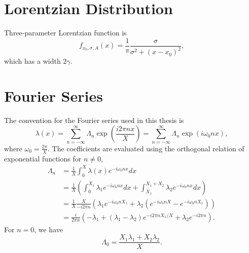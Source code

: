 \section{Lorentzian Distribution}


Three-parameter Lorentzian function is
\begin{equation}
  f_{x_0,\sigma,A}(x)= \frac{1}{\pi} \frac{\sigma}{\sigma^2 + (x-x_0)^2},
\end{equation}
which has a width $2\gamma$.


\section{Fourier Series}

The convention for the Fourier series used in this thesis is
\begin{equation}
\lambda(x) = \sum_{n=-\infty}^{\infty} \Lambda_n \exp\left( \frac{i2\pi n x}{X} \right) = \sum_{n=-\infty}^{\infty} \Lambda_n \exp\left( i \omega_0 n x \right),
\end{equation}
where $\omega_0 = \frac{2\pi}{X}$. The coefficients are evaluated using the orthogonal relation of exponential functions for $n\neq 0$,
\begin{align}
   \Lambda_n &= \frac{1}{X} \int_0^X \lambda(x) e^{ - i \omega_0 n x} dx \\
   & = \frac{1}{X} \left( \int_{0}^{X_1} \lambda_1 e^{ - i \omega_0 n x} dx + \int_{X_1}^{X_1+X_2} \lambda_2 e^{ - i \omega_0 n x} dx  \right) \\
   & = \frac{1}{X} \frac{X}{-i2\pi n} \left( \lambda_1 e^{-i\omega_0 n X_1} + \lambda_2 \left( e^{-i\omega_0 n X} - e^{-i\omega_0 n X_1}  \right) \right) \\
   & = \frac{i}{2\pi n} \left( -\lambda_1 + (\lambda_1 - \lambda_2) e^{-i2\pi n X_1/X} + \lambda_2 e^{-i 2\pi n} \right).
   \label{app-chap:convention-sec:fourier-series-eqn:parametric-resonance-castle-wall-fourier-coeff}
\end{align}
For $n=0$, we have
\begin{equation}
   \Lambda_0 = \frac{X_1 \lambda_1 + X_2 \lambda_2}{X}. 
\end{equation}
   



